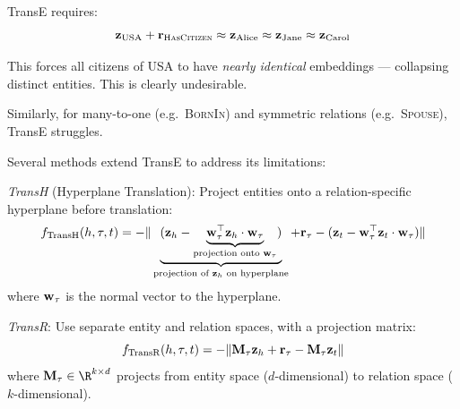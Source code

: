 \begin{notechapter}
\begin{keyidea}
TransE requires:
\[
\mathbf{z}_{\text{USA}} + \mathbf{r}_{\textsc{HasCitizen}} \approx \mathbf{z}_{\text{Alice}} \approx \mathbf{z}_{\text{Jane}} \approx \mathbf{z}_{\text{Carol}}
\]

This forces all citizens of USA to have \emph{nearly identical} embeddings --- collapsing distinct entities. This is clearly undesirable.

Similarly, for many-to-one (e.g.\ \textsc{BornIn}) and symmetric relations (e.g.\ \textsc{Spouse}), TransE struggles.
\end{keyidea}

\begin{definition}
Several methods extend TransE to address its limitations:

\emph{TransH} (Hyperplane Translation): Project entities onto a relation-specific hyperplane before translation:
\begin{equation}
f_{\text{TransH}}(h, \tau, t) = - \|
\underbrace{( \mathbf{z}_h - \underbrace{\mathbf{w}_\tau^\top \mathbf{z}_h \cdot
\mathbf{w}_\tau}_{\text{projection onto } \mathbf{w}_\tau})}_{\text{projection of } \mathbf{z}_h \text{ on hyperplane}}
+ \mathbf{r}_\tau
- (\mathbf{z}_t - \mathbf{w}_\tau^\top \mathbf{z}_t \cdot \mathbf{w}_\tau)
\|
\end{equation}
where $\mathbf{w}_\tau$ is the normal vector to the hyperplane.

\emph{TransR}: Use separate entity and relation spaces, with a projection matrix:
\begin{equation}
f_{\text{TransR}}(h, \tau, t) = -\|\mathbf{M}_\tau \mathbf{z}_h + \mathbf{r}_\tau - \mathbf{M}_\tau \mathbf{z}_t\|
\end{equation}
where $\vect{M}_\tau \in \R^{k \times d}$ projects from entity space ($d$-dimensional) to relation space ($k$-dimensional).
\end{definition}

\begin{figure}[htbp]
\centering
{}
\end{figure}
\end{notechapter}
